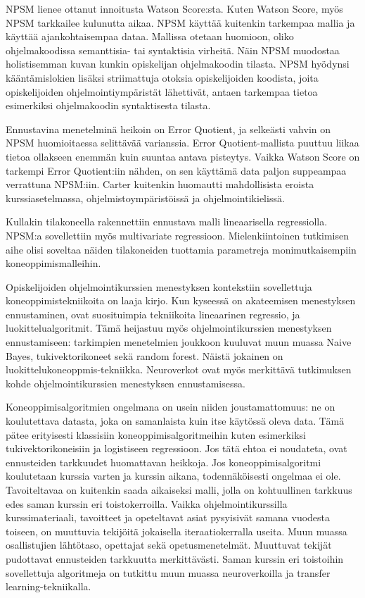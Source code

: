 \documentclass[finnish,twoside,openright]{HYgraduMLDS}
\begin{document}
NPSM lienee ottanut innoitusta Watson Score:sta. Kuten Watson Score, myös NPSM tarkkailee kulunutta aikaa. NPSM käyttää kuitenkin tarkempaa mallia ja käyttää ajankohtaisempaa dataa. Mallissa otetaan huomioon, oliko ohjelmakoodissa semanttisia- tai syntaktisia virheitä. Näin NPSM muodostaa holistisemman kuvan kunkin opiskelijan ohjelmakoodin tilasta. NPSM hyödynsi kääntämislokien lisäksi striimattuja otoksia opiskelijoiden koodista, joita opiskelijoiden ohjelmointiympäristät lähettivät, antaen tarkempaa tietoa esimerkiksi ohjelmakoodin syntaktisesta tilasta. 

Ennustavina menetelminä heikoin on Error Quotient, ja selkeästi vahvin on NPSM huomioitaessa selittävää varianssia\cite{carter2015normalized}. Error Quotient-mallista puuttuu liikaa tietoa ollakseen enemmän kuin suuntaa antava pisteytys\cite{jadud2006methods}. Vaikka Watson Score on tarkempi Error Quotient:iin nähden, on sen käyttämä data paljon suppeampaa verrattuna NPSM:iin\cite{carter2015normalized}. Carter kuitenkin huomautti mahdollisista eroista kurssiasetelmassa, ohjelmistoympäristöissä ja ohjelmointikielissä\cite{carter2015normalized}. 

Kullakin tilakoneella rakennettiin ennustava malli lineaarisella regressiolla. NPSM:a sovellettiin myös multivariate regressioon. Mielenkiintoinen tutkimisen aihe olisi soveltaa näiden tilakoneiden tuottamia parametreja monimutkaisempiin koneoppimismalleihin.

Opiskelijoiden ohjelmointikurssien menestyksen kontekstiin sovellettuja koneoppimistekniikoita on laaja kirjo. Kun kyseessä on akateemisen menestyksen ennustaminen, ovat suosituimpia tekniikoita lineaarinen regressio, ja luokittelualgoritmit\cite{hellas2018predicting}. Tämä heijastuu myös ohjelmointikurssien menestyksen ennustamiseen: tarkimpien menetelmien joukkoon kuuluvat muun muassa Naive Bayes\cite{bergin2015using}, tukivektorikoneet\cite{bergin2015using} sekä random forest\cite{lagus2018transfer}. Näistä jokainen on luokittelukoneoppmis-tekniikka. Neuroverkot ovat myös merkittävä tutkimuksen kohde ohjelmointikurssien menestyksen ennustamisessa\cite{Castro-Wunsch:2017:ENN:3017680.3017792}. 

Koneoppimisalgoritmien ongelmana on usein niiden joustamattomuus: ne on koulutettava datasta, joka on samanlaista kuin itse käytössä oleva data. Tämä pätee erityisesti klassisiin koneoppimisalgoritmeihin kuten esimerkiksi tukivektorikoneisiin ja logistiseen regressioon. Jos tätä ehtoa ei noudateta, ovat ennusteiden tarkkuudet huomattavan heikkoja. Jos koneoppimisalgoritmi koulutetaan kurssia varten ja kurssin aikana, todennäköisesti ongelmaa ei ole. Tavoiteltavaa on kuitenkin saada aikaiseksi malli, jolla on kohtuullinen tarkkuus edes saman kurssin eri toistokerroilla. Vaikka ohjelmointikurssilla kurssimateriaali, tavoitteet ja opeteltavat asiat pysyisivät samana vuodesta toiseen, on muuttuvia tekijöitä jokaisella iteraatiokerralla useita. Muun muassa osallistujien lähtötaso, opettajat sekä opetusmenetelmät. Muuttuvat tekijät pudottavat ennusteiden tarkkuutta merkittävästi. Saman kurssin eri toistoihin sovellettuja algoritmeja on tutkittu muun muassa neuroverkoilla\cite{Castro-Wunsch:2017:ENN:3017680.3017792} ja transfer learning\cite{lagus2018transfer}-tekniikalla.
\end{document}
